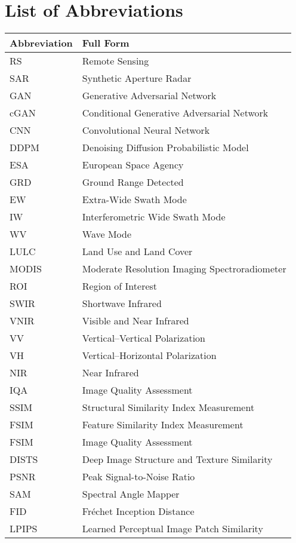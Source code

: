 \chapter*{List of Abbreviations}

\begin{table}[h!]
\centering
\begin{tabular}{ll}
\textbf{Abbreviation} & \textbf{Full Form} \\
\midrule
RS      & Remote Sensing \\
SAR     & Synthetic Aperture Radar \\
GAN     & Generative Adversarial Network \\
cGAN    & Conditional Generative Adversarial Network \\
CNN     & Convolutional Neural Network \\
DDPM    & Denoising Diffusion Probabilistic Model \\
ESA     & European Space Agency \\
GRD     & Ground Range Detected \\
EW      & Extra-Wide Swath Mode \\
IW      & Interferometric Wide Swath Mode \\
WV      & Wave Mode \\
LULC    & Land Use and Land Cover \\
MODIS   & Moderate Resolution Imaging Spectroradiometer \\
ROI     & Region of Interest \\
SWIR    & Shortwave Infrared \\
VNIR    & Visible and Near Infrared \\
VV      & Vertical–Vertical Polarization \\
VH      & Vertical–Horizontal Polarization \\
NIR     & Near Infrared \\
IQA     & Image Quality Assessment \\
SSIM    & Structural Similarity Index Measurement \\
FSIM    & Feature Similarity Index Measurement \\
FSIM    & Image Quality Assessment \\
DISTS   & Deep Image Structure and Texture Similarity \\
PSNR    & Peak Signal-to-Noise Ratio \\
SAM     & Spectral Angle Mapper \\
FID     & Fréchet Inception Distance \\
LPIPS   & Learned Perceptual Image Patch Similarity \\
\end{tabular}
\end{table}
